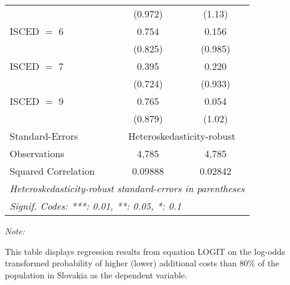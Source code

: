 \begin{table}[htbp!]
\begin{adjustbox}{width = 1\textwidth, max height = 0.95\textheight, center}
\begin{threeparttable}[b]
\begin{tabular}{lcc}
                                 & (0.972)        & (1.13)\\   
            ISCED $=$ 6          & 0.754          & 0.156\\   
                                 & (0.825)        & (0.985)\\   
            ISCED $=$ 7          & 0.395          & 0.220\\   
                                 & (0.724)        & (0.933)\\   
            ISCED $=$ 9          & 0.765          & 0.054\\   
                                 & (0.879)        & (1.02)\\   
            \midrule 
            Standard-Errors & \multicolumn{2}{c}{Heteroskedasticity-robust} \\ 
            Observations         & 4,785          & 4,785\\  
            Squared Correlation  & 0.09888        & 0.02842\\  
            \midrule \midrule
            \multicolumn{3}{l}{\emph{Heteroskedasticity-robust standard-errors in parentheses}}\\
            \multicolumn{3}{l}{\emph{Signif. Codes: ***: 0.01, **: 0.05, *: 0.1}}\\
         \end{tabular}
         
         \begin{tablenotes}\item \medskip \textit{Note:}
            \item This table displays regression results from equation LOGIT on the log-odds transformed probability of higher (lower) additional costs than 80\% of the population in Slovakia as the dependent variable. 
         \end{tablenotes}
      \end{threeparttable}
   \end{adjustbox}
\end{table}



